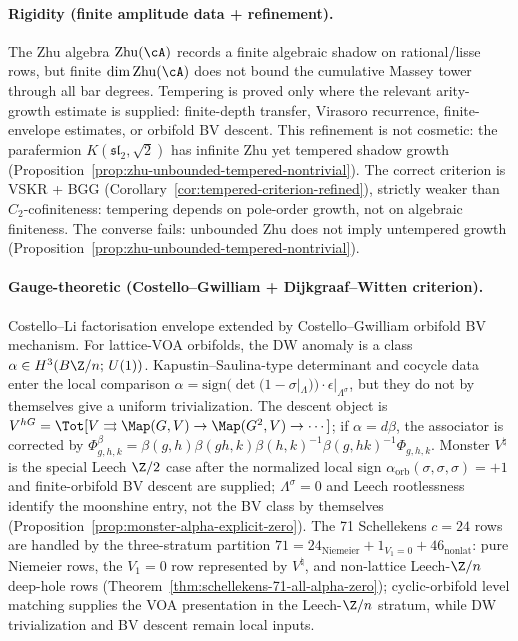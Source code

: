 \paragraph{Rigidity (finite amplitude data + refinement).}
The Zhu algebra $\mathrm{Zhu}(\cA)$ records a finite algebraic shadow
on rational/lisse rows, but finite $\dim\mathrm{Zhu}(\cA)$ does not
bound the cumulative Massey tower through all bar degrees. Tempering
is proved only where the relevant arity-growth estimate is supplied:
finite-depth transfer, Virasoro recurrence, finite-envelope estimates,
or orbifold BV descent. This refinement is not cosmetic:
the parafermion $K(\mathfrak{sl}_2, \sqrt{2})$ has infinite Zhu
yet tempered shadow growth
(Proposition~\ref{prop:zhu-unbounded-tempered-nontrivial}). The
correct criterion is VSKR + BGG
(Corollary~\ref{cor:tempered-criterion-refined}), strictly weaker
than $C_2$-cofiniteness: tempering depends on pole-order growth,
not on algebraic finiteness. The converse fails:
unbounded Zhu does not imply untempered growth
(Proposition~\ref{prop:zhu-unbounded-tempered-nontrivial}).

\paragraph{Gauge-theoretic (Costello--Gwilliam + Dijkgraaf--Witten
criterion).}
Costello--Li factorisation envelope extended by Costello--Gwilliam
orbifold BV mechanism. For lattice-VOA orbifolds,
the DW anomaly is a class
$\alpha \in H^3(B\Z/n;\, U(1))$. Kapustin--Saulina-type determinant
and cocycle data enter the local comparison
$\alpha = \mathrm{sign}(\det(1 - \sigma|_\Lambda)) \cdot
\epsilon|_{\Lambda^\sigma}$, but they do not by themselves give a
uniform trivialization. The descent object is
$V^{hG}=\Tot[V\rightrightarrows\Map(G,V)\to\Map(G^2,V)\to\cdots]$;
if $\alpha=d\beta$, the associator is corrected by
$\Phi^\beta_{g,h,k}=
\beta(g,h)\beta(gh,k)\beta(h,k)^{-1}\beta(g,hk)^{-1}\Phi_{g,h,k}$.
Monster $V^\natural$ is the special
Leech $\Z/2$ case after the normalized local sign
$\alpha_{\mathrm{orb}}(\sigma,\sigma,\sigma)=+1$ and
finite-orbifold BV descent are supplied; $\Lambda^\sigma=0$ and
Leech rootlessness identify the moonshine entry, not the BV class
by themselves (Proposition~\ref{prop:monster-alpha-explicit-zero}).
The 71
Schellekens $c = 24$ rows are handled by the three-stratum partition
$71 = 24_{\mathrm{Niemeier}} + 1_{V_1=0} + 46_{\mathrm{nonlat}}$:
pure Niemeier rows, the $V_1=0$ row represented by
$V^\natural$, and non-lattice Leech-$\Z/n$ deep-hole rows
(Theorem~\ref{thm:schellekens-71-all-alpha-zero}); cyclic-orbifold
level matching supplies the VOA presentation in the Leech-$\Z/n$
stratum, while DW trivialization and BV descent remain local inputs.

